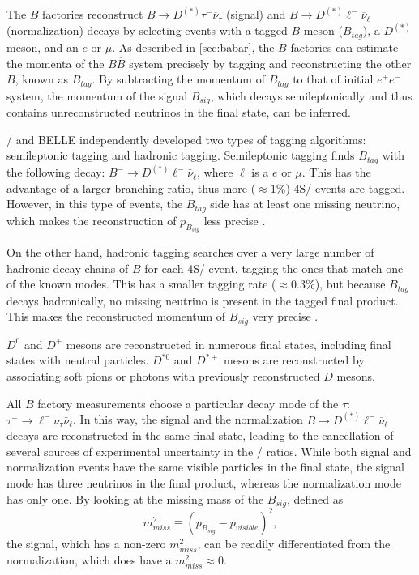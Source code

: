 The $B$ factories reconstruct $B \rightarrow D^{(*)} \tau^- \overline{\nu}_\tau$
(signal) and $B \rightarrow D^{(*)} \ell^- \overline{\nu}_\ell$ (normalization)
decays by selecting events with a tagged $B$ meson ($B_{tag}$), a $D^{(*)}$
meson, and an $e$ or $\mu$.
As described in \autoref{sec:babar}, the $B$ factories can estimate the momenta
of the $B \overline{B}$ system precisely by tagging and reconstructing the other
$B$, known as $B_{tag}$.
By subtracting the momentum of $B_{tag}$ to that of initial $e^+e^-$ system, the
momentum of the signal $B_{sig}$, which decays semileptonically and thus
contains unreconstructed neutrinos in the final state, can be inferred.

\BaBar/ and BELLE independently developed two types of tagging algorithms:
semileptonic tagging and hadronic tagging.
Semileptonic tagging finds $B_{tag}$ with the following decay:
$B^- \rightarrow D^{(*)} \ell^- \bar{\nu}_\ell$, where $\ell$ is a $e$ or $\mu$.
This has the advantage of a larger branching ratio, thus more ($\approx 1\%$)
\Y4S/ events are tagged.
However, in this type of events, the $B_{tag}$ side has at least one missing
neutrino, which makes the reconstruction of $p_{B_{sig}}$ less
precise \cite{Ciezarek:2017yzh}.

On the other hand, hadronic tagging searches over a very large number of
hadronic decay chains of $B$ for each \Y4S/ event, tagging the ones that match
one of the known modes.
This has a smaller tagging rate ($\approx 0.3\%$), but because $B_{tag}$ decays
hadronically, no missing neutrino is present in the tagged final product.
This makes the reconstructed momentum of $B_{sig}$ very
precise \cite{Lees:2013uzd,Ciezarek:2017yzh}.

$D^{0}$ and $D^{+}$ mesons are reconstructed in numerous final states, including
final states with neutral particles.
$D^{*0}$ and $D^{*+}$ mesons are reconstructed by associating soft pions or
photons with previously reconstructed $D$ mesons.

All $B$ factory measurements choose a particular decay mode of the $\tau$:
$\tau^- \rightarrow \ell^- \nu_\tau \bar{\nu}_\ell$.
In this way, the signal and the normalization
$B \rightarrow D^{(*)} \ell^- \overline{\nu}_\ell$ decays are reconstructed in
the same final state, leading to the cancellation of several sources of
experimental uncertainty in the \RDDst/ ratios.
While both signal and normalization events have the same visible particles in
the final state, the signal mode has three neutrinos in the final product,
whereas the normalization mode has only one.
By looking at the missing mass of the $B_{sig}$, defined as
\begin{equation}
    m^2_{miss} \equiv \left(p_{B_{sig}} - p_{visible}\right)^2,
\end{equation}
the signal, which has a non-zero $m^2_{miss}$, can be readily differentiated
from the normalization, which does have a $m^2_{miss} \approx 0$.

